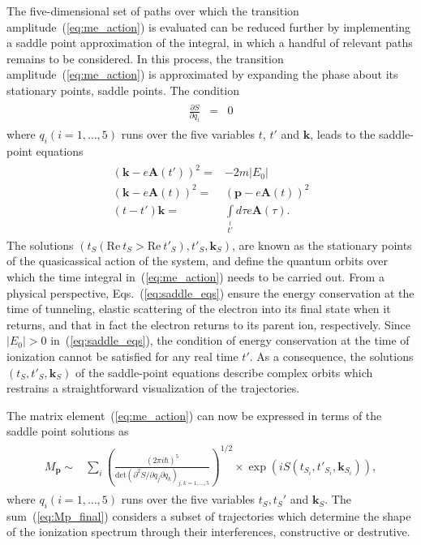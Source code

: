 The five-dimensional set of paths over which the transition
amplitude~(\ref{eq:me_action}) is evaluated can be reduced further by
implementing a saddle point approximation of the integral, in which a
handful of relevant paths remains to be considered. In this process,
the transition amplitude~(\ref{eq:me_action}) is approximated by
expanding the phase about its stationary points, saddle points. The
condition
\begin{eqnarray}
\label{eq:S_stationary}
\begin{split}
\frac{\partial S}{\partial q_{i}} & = & 0
\end{split}
\end{eqnarray}
where $q_{i}(i =1, \dots, 5)$ runs over the five variables $t$, $t'$
and $\mathbf{k}$, leads to the saddle-point
equations~\cite{Lewenstein_1995,KopoldOptComm2000}
\begin{eqnarray}
\label{eq:saddle_eqs}
\begin{split}
\left( \mathbf{k} - e\mathbf{A}(t') \right)^{2} = &
-2m|E_{0}| \\
\left( \mathbf{k} - e\mathbf{A}(t)\right)^{2} = &
\left( \mathbf{p} - e\mathbf{A}(t) \right)^{2} \\
(t - t') \mathbf{k} = & \int\limits_{t'}\limits^{t}
d\tau e\mathbf{A}(\tau).
\end{split}
\end{eqnarray}
The solutions
$(t_{S}(\mathrm{Re}\ t_{S} > \mathrm{Re}\ t'_{S}), t'_{S},
\mathbf{k}_{S})$,
are known as the stationary points of the quasicassical action of the
system, and define the quantum orbits over which the time integral
in~(\ref{eq:me_action}) needs to be carried out. From a physical
perspective, Eqs.~(\ref{eq:saddle_eqs}) ensure the energy conservation
at the time of tunneling, elastic scattering of the electron into its
final state when it returns, and that in fact the electron returns to
its parent ion, respectively. Since $|E_{0}| > 0$
in~(\ref{eq:saddle_eqs}), the condition of energy conservation at the
time of ionization cannot be satisfied for any real time $t'$. As a
consequence, the solutions $(t_{S}, t'_{S}, \mathbf{k}_{S})$ of the
saddle-point equations describe complex orbits which restrains a
straightforward visualization of the trajectories.

The matrix element~(\ref{eq:me_action}) can now be expressed in terms
of the saddle point solutions as
\begin{eqnarray}
\label{eq:Mp_final}
\begin{split}
M_{\mathbf{p}} \sim & \sum\limits_{i} \left( \frac{(2\pi i \hbar)^{5}}
{\mathrm{det} (\partial^{2}S / \partial q_{j} \partial q_{k})_{j,k = 1, \dots, 5}}
\right)^{1/2} \times \exp(i S(t_{S_{i}}, t'_{S_{i}}, \mathbf{k}_{S_{i}})),
\end{split}
\end{eqnarray}
where $q_{i}(i = 1,\dots,5)$ runs over the five variables
$t_{S}, t_{S}'$ and $\mathbf{k}_{S}$. The sum~(\ref{eq:Mp_final})
considers a subset of trajectories which determine the shape of the
ionization spectrum through their interferences, constructive or
destrutive.


